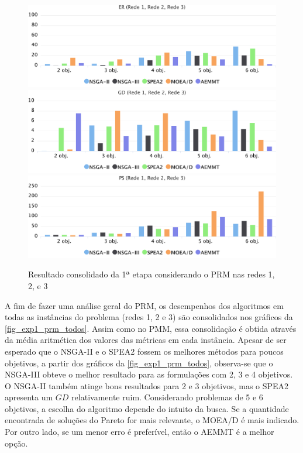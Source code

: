 \begin{figure}[!htbp]	
	\includegraphics[width=1\textwidth]{cap_experimentos/figs/etapa1/er-mrp-todos}
	\includegraphics[width=1\textwidth]{cap_experimentos/figs/etapa1/gd-mrp-todos}
	\includegraphics[width=1\textwidth]{cap_experimentos/figs/etapa1/ps-mrp-todos}
	\caption{\label{fig_exp1_prm_todos}Resultado consolidado da 1ª etapa considerando o PRM nas redes 1, 2, e 3}
\end{figure}

A fim de fazer uma análise geral do PRM, os desempenhos dos algoritmos em todas as instâncias do problema (redes 1, 2 e 3) são consolidados nos gráficos da \autoref{fig_exp1_prm_todos}. Assim como no PMM, essa consolidação é obtida através da média aritmética dos valores das métricas em cada instância. Apesar de ser esperado que o NSGA-II e o SPEA2 fossem os melhores métodos para poucos objetivos, a partir dos gráficos da \autoref{fig_exp1_prm_todos}, observa-se que o NSGA-III obteve o melhor resultado para as formulações com 2, 3 e 4 objetivos. O NSGA-II também atinge bons resultados para 2 e 3 objetivos, mas o SPEA2 apresenta um $GD$ relativamente ruim. Considerando problemas de 5 e 6 objetivos, a escolha do algoritmo depende do intuito da busca. Se a quantidade encontrada de soluções do Pareto for mais relevante, o MOEA/D é mais indicado. Por outro lado, se um menor erro é preferível, então o AEMMT é a melhor opção.

